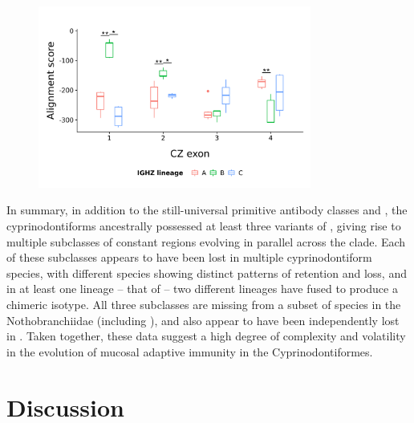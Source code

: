 \begin{figure}
	\centering
	\includegraphics[width=0.8\textwidth]{_Figures/png/ppl-cz-aln-aa.png}
	\label{fig:ppl-cz-aln}
\end{figure}
	
In summary, in addition to the still-universal primitive antibody classes  and , the cyprinodontiforms ancestrally possessed at least three variants of , giving rise to multiple subclasses of  constant regions evolving in parallel across the clade. Each of these subclasses appears to have been lost in multiple cyprinodontiform species, with different species showing distinct patterns of retention and loss, and in at least one lineage -- that of  -- two different  lineages have fused to produce a chimeric isotype. All three subclasses are missing from a subset of species in the Nothobranchiidae (including \nfu), and also appear to have been independently lost in . Taken together, these data suggest a high degree of complexity and volatility in the evolution of mucosal adaptive immunity in the Cyprinodontiformes.

\newpage

\section{Discussion}


